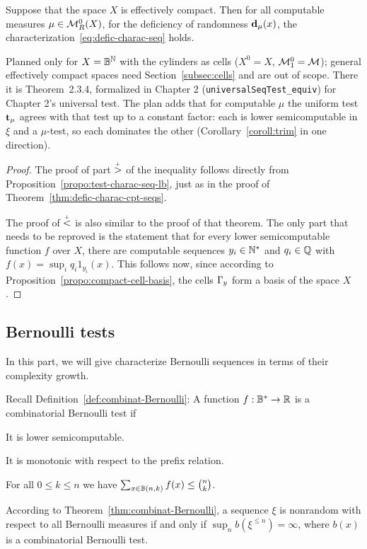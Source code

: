  \begin{theorem}\label{thm:defic-charac-compact}
Suppose that the space \( X \) is effectively compact.
Then for all computable measures \( \mu\in\mathcal{M}_{R}^{0}(X) \), 
for the deficiency of randomness \( \mathbf{d}_{\mu}(x) \), 
the characterization~\eqref{eq:defic-charac-seq} holds.
 \end{theorem}

\begin{formalization}
Planned only for $X = \mathbb{B}^{\mathbb{N}}$ with the cylinders as cells ($X^{0} = X$, $\mathcal{M}^{0}_{1} = \mathcal{M}$);
general effectively compact spaces need Section~\ref{subsec:cells} and are out of scope. There it
is Theorem~2.3.4, formalized in Chapter 2 (\texttt{universalSeqTest\_equiv}) for Chapter 2's
universal test. The plan adds that for computable $\mu$ the uniform test $\mathbf{t}_{\mu}$ agrees with
that test up to a constant factor: each is lower semicomputable in $\xi$ and a $\mu$-test, so
each dominates the other (Corollary~\ref{coroll:trim} in one direction).
\end{formalization}
 \begin{proof}
The proof of part \( \stackrel{{}_+}{>} \) of the inequality follows directly from
Proposition~\ref{propo:test-charac-seq-lb}, just as in the proof of 
Theorem~\ref{thm:defic-charac-cpt-seqs}.

The proof of \( \stackrel{{}_+}{<} \) is also similar to the proof of that theorem.
The only part that needs to be reproved is the statement that
for every lower semicomputable function \( f \) over \( X \),
there are computable sequences \( y_{i}\in\mathbb{N}^{*} \) and
\( q_{i}\in\mathbb{Q} \) with \( f(x) = \sup_{i} q_{i} 1_{y_{i}}(x) \).
This follows now, since according to
Proposition~\ref{propo:compact-cell-basis}, the cells \( \Gamma_{y} \) form a basis of
the space \( X \).
 \end{proof}


\subsection{Bernoulli tests}

In this part, we will give characterize Bernoulli sequences in terms of their
complexity growth.

Recall Definition~\ref{def:combinat-Bernoulli}:
A function \( f:\mathbb{B}^{*}\to\mathbb{R} \) is a combinatorial Bernoulli test if
 \begin{alphenum}
  \item It is lower semicomputable.
  \item It is monotonic with respect to the prefix relation.
  \item For all \( 0\le k\le n \) we have \( \sum_{x\in\mathbb{B}(n,k)} f(x) \le \binom{n}{k} \).
 \end{alphenum}
According to Theorem~\ref{thm:combinat-Bernoulli}, a 
sequence \( \xi \) is nonrandom with respect to all Bernoulli measures if and
only if \( \sup_{n}b(\xi^{\le n})=\infty \), where \( b(x) \) is a combinatorial
Bernoulli test.

